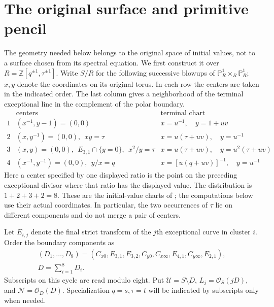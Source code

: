 \section{The original surface and primitive pencil}
\label{geom:section}

The geometry needed below belongs to the original space of initial values,
not to a surface chosen from its spectral equation.  We first construct it
over $R=\mathbb Z[q^{\pm1},\tau^{\pm1}]$.  Write $S/R$ for the following
successive blowups of $\mathbb P^1_R\times_R\mathbb P^1_R$; $x,y$ denote
the coordinates on its original torus.  In each row the centers are taken
in the indicated order.  The last column gives a neighborhood of the
terminal exceptional line in the complement of the polar boundary.
\begin{equation}
\begin{array}{c|l|l}
 &\text{centers}&\text{terminal chart}\\ \hline
1&(x^{-1},y-1)=(0,0)&x=u^{-1},\quad y=1+uv\\
2&(x,y^{-1})=(0,0),\ \ xy=\tau
 &x=u(\tau+uv),\quad y=u^{-1}\\
3&(x,y)=(0,0),\ \ E_{3,1}\cap\{y=0\},\ \ x^2/y=\tau
 &x=u(\tau+uv),\quad y=u^2(\tau+uv)\\
4&(x^{-1},y^{-1})=(0,0),\ \ y/x=q
 &x=[u(q+uv)]^{-1},\quad y=u^{-1}
\end{array}
\label{geom:charts}
\end{equation}
Here a center specified by one displayed ratio is the point on the
preceding exceptional divisor where that ratio has the displayed value.
The distribution is $1+2+3+2=8$.  These are the initial-value charts of
\cite{JoshiRoffelsen2026}; the computations below use their actual
coordinates.  In particular, the two occurrences of $\tau$ lie on
different components and do not merge a pair of centers.

Let $E_{i,j}$ denote the final strict transform of the $j$th exceptional
curve in cluster $i$.  Order the boundary components as
\begin{equation}
\begin{gathered}
(D_1,\ldots,D_8)=
(C_{x0},E_{3,1},E_{3,2},C_{y0},C_{x\infty},
 E_{4,1},C_{y\infty},E_{2,1}),\\
D=\sum_{i=1}^8D_i.
\end{gathered}
\label{geom:boundary-order}
\end{equation}
Subscripts on this cycle are read modulo eight.  Put
$\mathcal U=S\setminus D$, $L_j=\mathcal O_S(jD)$, and
$\mathcal N=\mathcal O_D(D)$.  Specialization $q=s,\tau=t$ will be
indicated by subscripts only when needed.

